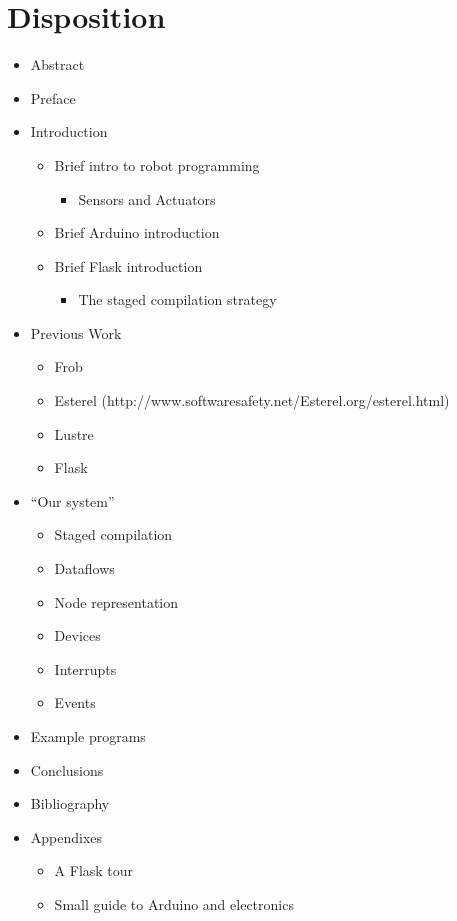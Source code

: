 \documentclass[a4paper,oneside, draft]{memoir}
\begin{document}
\section{Disposition}
\begin{itemize}
\item Abstract

\item Preface

\item Introduction
  \begin{itemize}
  \item Brief intro to robot programming
    \begin{itemize}
     \item Sensors and Actuators
    \end{itemize}
  \item Brief Arduino introduction
  \item Brief Flask introduction
    \begin{itemize}
     \item The staged compilation strategy
    \end{itemize}
  \end{itemize}

\item Previous Work
  \begin{itemize}
  \item Frob
  \item Esterel
    (http://www.softwaresafety.net/Esterel.org/esterel.html)
  \item Lustre \cite{lustre91}
  \item Flask
  \end{itemize}

\item "`Our system"'
  \begin{itemize}
  \item Staged compilation
  \item Dataflows
  \item Node representation
  \item Devices
  \item Interrupts
  \item Events
  \end{itemize}

\item Example programs

\item Conclusions

\item Bibliography

\item Appendixes
  \begin{itemize}
  \item A Flask tour
  \item Small guide to Arduino and electronics
  \end{itemize}
\end{itemize}  
\end{document}
